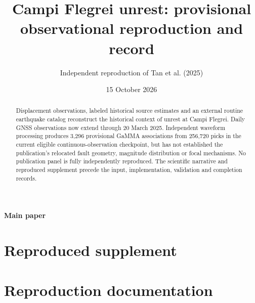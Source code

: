 \documentclass[11pt]{article}
\title{Campi Flegrei unrest: provisional observational reproduction and record}
\author{Independent reproduction of Tan et al. (2025)}
\date{15 October 2026}
\begin{document}
\maketitle



\begin{center}\large\textbf{Main paper}\end{center}
\begin{abstract}
Displacement observations, labeled historical source estimates and an external routine earthquake catalog reconstruct the historical context of unrest at Campi Flegrei. Daily GNSS observations now extend through 20 March 2025. Independent waveform processing produces 3,296 provisional GaMMA associations from 256,720 picks in the current eligible continuous-observation checkpoint, but has not established the publication's relocated fault geometry, magnitude distribution or focal mechanisms. No publication panel is fully independently reproduced.  The scientific narrative and reproduced supplement precede the input, implementation, validation and completion records.
\end{abstract}

\clearpage
{}
\section*{Reproduced supplement}
\setcounter{section}{0}
\renewcommand{\thesection}{S\arabic{section}}
\renewcommand{\theHsection}{supplement.\arabic{section}}
\setcounter{figure}{0}
\renewcommand{\thefigure}{S\arabic{figure}}

\clearpage
{}
\section*{Reproduction documentation}
\setcounter{section}{0}
\renewcommand{\thesection}{D\arabic{section}}
\renewcommand{\theHsection}{documentation.\arabic{section}}
\setcounter{figure}{0}
\renewcommand{\thefigure}{D\arabic{figure}}

\end{document}

